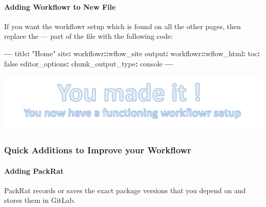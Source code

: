 \documentclass[openany]{article}
\newenvironment{Shaded}{\begin{snugshade}}{\end{snugshade}}
\newcommand{\NormalTok}[1]{#1}
\newcommand{\OperatorTok}[1]{\textcolor[rgb]{0.81,0.36,0.00}{\textbf{#1}}}
\newcommand{\StringTok}[1]{\textcolor[rgb]{0.31,0.60,0.02}{#1}}
\let\oldparagraph\paragraph
\renewcommand{\paragraph}[1]{\oldparagraph{#1}\mbox{}}
\begin{document}
\hypertarget{adding-workflowr-to-new-file}{%
\paragraph{Adding Workflowr to New File}\label{adding-workflowr-to-new-file}}

If you want the workflowr setup which is found on all the other pages, then replace the --- part of the file with the following code:

\begin{Shaded}
\begin{Highlighting}[]
            \OperatorTok{---}
\StringTok{            }\NormalTok{title}\OperatorTok{:}\StringTok{ "Home"}
\NormalTok{            site}\OperatorTok{:}\StringTok{ }\NormalTok{workflowr}\OperatorTok{::}\NormalTok{wflow_site}
\NormalTok{            output}\OperatorTok{:}
\StringTok{              }\NormalTok{workflowr}\OperatorTok{::}\NormalTok{wflow_html}\OperatorTok{:}
\StringTok{                }\NormalTok{toc}\OperatorTok{:}\StringTok{ }\NormalTok{false}
\NormalTok{            editor_options}\OperatorTok{:}
\StringTok{              }\NormalTok{chunk_output_type}\OperatorTok{:}\StringTok{ }\NormalTok{console}
            \OperatorTok{---}
\end{Highlighting}
\end{Shaded}

\begin{center}\includegraphics[width=0.6\linewidth]{images/Workflow_Photos/uMadeIt2} \end{center}

\hypertarget{quick-additions-to-improve-your-workflowr}{%
\subsubsection{Quick Additions to Improve your Workflowr}\label{quick-additions-to-improve-your-workflowr}}

\hypertarget{adding-packrat-1}{%
\paragraph{Adding PackRat}\label{adding-packrat-1}}

PackRat records or saves the exact package versions that you depend on and stores them in GitLab.
\end{document}

